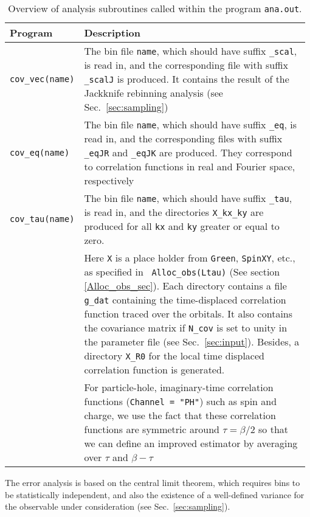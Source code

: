 \begin{table}[h]
	\begin{center}
	\begin{tabular}{@{} p{0.18\linewidth} @{$\;$} p{0.8\linewidth} @{}}\toprule
		Program & Description \\\midrule
		\texttt{cov\_vec(name)}  &  
		  The bin file \texttt{name}, which should have suffix \texttt{\_scal}, is read in, and  the corresponding file with suffix \texttt{\_scalJ} is produced. It contains the result of the Jackknife rebinning analysis (see Sec.~\ref{sec:sampling}) \\
		\texttt{cov\_eq(name)}    &  
		  The bin file \texttt{name}, which should have suffix \texttt{\_eq}, is read in, and the corresponding files with suffix \texttt{\_eqJR} and \texttt{\_eqJK} are produced. They  correspond to correlation functions in real and Fourier space, respectively \\
		\texttt{cov\_tau(name)}   &  
		  The bin file \texttt{name}, which should have suffix \texttt{\_tau}, is read in, and the directories \texttt{X\_kx\_ky} are produced for all \texttt{kx} and \texttt{ky} greater or equal to zero. \\
		& Here \texttt{X}  is a place holder from \texttt{Green}, \texttt{SpinXY}, etc., as specified in \texttt{ Alloc\_obs(Ltau)} (See section \ref{Alloc_obs_sec}). Each directory contains  a  file    \texttt{g\_dat}  containing the  time-displaced correlation function traced over the  orbitals.  It also contains the covariance matrix if \texttt{N\_cov} is set to unity in the parameter file (see Sec.~\ref{sec:input}). Besides, a directory \texttt{X\_R0} for the local time displaced correlation function is generated. \\
		& For particle-hole, imaginary-time correlation functions (\texttt{Channel = "PH"}) such as spin and charge, we use the fact that these correlation functions  are symmetric around $\tau = \beta/2$ so that we can define an improved estimator by averaging over $\tau$ and $\beta - \tau$
		\\\bottomrule
	\end{tabular}
	\caption{Overview of analysis subroutines called within the program \texttt{ana.out}. \label{table:analysis_programs}}
\end{center}
\end{table}
%
The error analysis is based on the central limit theorem, which requires bins to be statistically independent, and also the existence of a well-defined variance for the observable under consideration (see Sec.~\ref{sec:sampling}).
